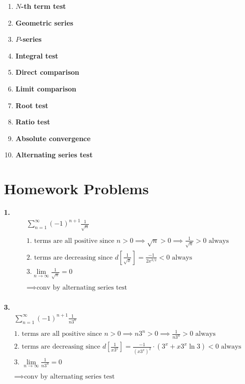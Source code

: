 \documentclass{article}
\begin{document}
\begin{enumerate}
\item \textbf{$N$-th term test}
\item \textbf{Geometric series}
\item \textbf{$P$-series}
\item \textbf{Integral test}
\item \textbf{Direct comparison}
\item \textbf{Limit comparison}
\item \textbf{Root test}
\item \textbf{Ratio test}
\item \textbf{Absolute convergence}
\item \textbf{Alternating series test}
\end{enumerate}

\newpage

\section*{Homework Problems}

\noindent
\textbf{1.}
\begin{gather*}
\sum_{n=1}^{\infty} (-1)^{n+1} \frac{1}{\sqrt{n}}
\\
\\
\text{1. terms are all positive since } n > 0 \implies \sqrt{n} > 0
\implies \frac{1}{\sqrt{n}} > 0 \text{~always}
\\
\text{2. terms are decreasing since } d \left[ \frac{1}{\sqrt{x}} \right]
= \frac{-1}{2x^{3/2}} < 0 \text{~always}
\\
\text{3.}
\lim_{n \to \infty} \frac{1}{\sqrt{n}}=0
\\
\\
\implies \text{conv by alternating series test}
\end{gather*}
\hfill
\\




\noindent
\textbf{3.}
\begin{gather*}
\sum_{n=1}^{\infty} (-1)^{n+1} \frac{1}{n3^n}
\\
\\
\text{1. terms are all positive since } n > 0 \implies n3^n > 0
\implies \frac{1}{n3^n}>0 \text{~always}
\\
\text{2. terms are decreasing since } d \left[ \frac{1}{x3^x} \right]
= \frac{-1}{(x3^x)^2} \cdot (3^x+x 3^x \ln 3) < 0 \text{~always}
\\
\text{3. }
\lim_{n \to \infty} \frac{1}{n3^n} = 0
\\
\\
\implies \text{conv by alternating series test}
\end{gather*}
\hfill
\\
\end{document}
